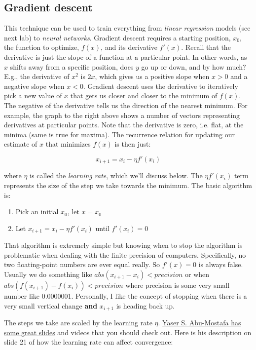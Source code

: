 \begin{fullwidth}
\subsection{Gradient descent}

This technique can be used to train everything from {\em linear regression} models (see next lab) to {\em neural networks}.  Gradient descent requires a starting position, $x_0$, the function to optimize, $f(x)$, and its derivative $f'(x)$.  Recall that the derivative is just the slope of a function at a particular point. In other words, as $x$ shifts away from a specific position, does $y$ go up or down, and by how much?  E.g., the derivative of $x^2$ is $2x$, which gives us a positive slope when $x>0$ and a negative slope when $x<0$.  Gradient descent uses the derivative to iteratively pick a new value of $x$ that gets us closer and closer to the minimum of $f(x)$.   The negative of the derivative tells us the direction of the nearest minimum. For example, the graph to the right above shows a number of vectors representing derivatives at particular points. Note that the derivative is zero, i.e. flat, at the minima (same is true for maxima). The recurrence relation for updating our estimate of $x$ that minimizes $f(x)$ is then just:

\[
x_{i+1} = x_i - \eta f'(x_i)
\]

\noindent where $\eta$ is called the {\em learning rate}, which we'll discuss below. The $\eta f'(x_{i})$ term represents the size of the step we take towards the minimum. 
The basic algorithm is:

\begin{enumerate}
\item Pick an initial $x_0$, let $x = x_0$
\item Let $x_{i+1} = x_i - \eta f'(x_i)$ until $f'(x_i)=0$
\end{enumerate}

That algorithm is extremely simple but knowing when to stop the algorithm is problematic when dealing with the finite precision of computers. Specifically, no two floating-point numbers are ever equal really. So $f'(x) = 0$ is always false. Usually we do something like $abs(x_{i+1} - x_i) < precision$ or when $abs(f(x_{i+1}) - f(x_i)) < precision$ where precision is some very small number like 0.0000001.  Personally, I like the concept of stopping when there is a very small vertical change {\bf and} $x_{i+1}$ is heading back up.

The steps we take are scaled by the learning rate $\eta$.  \href{http://www.amlbook.com/slides/iTunesU_Lecture09_May_01.pdf}{Yaser S. Abu-Mostafa has some great slides} and videos that you should check out. Here is his description on slide 21 of how the learning rate can affect convergence:


\end{fullwidth}
